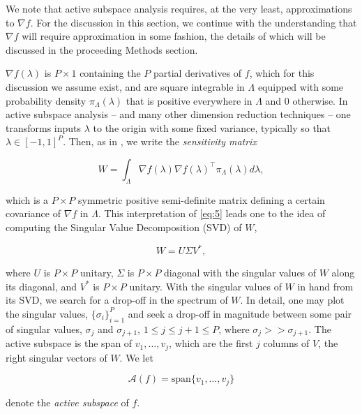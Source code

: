 \documentclass{amsart}
\newcommand{\A}{\mathcal{A}}
\begin{document}
We note that active subspace analysis requires, at the very least, approximations to $\nabla f$. For the discussion in this section, we continue with the understanding that $\nabla f$ will require approximation in some fashion, the details of which will be discussed in the proceeding Methods section. 

$\nabla f(\lambda)$ is $P\times 1$ containing the $P$ partial derivatives of $f$, which for this discussion we assume exist, and are square integrable in $\Lambda$ equipped with some probability density $\pi_\Lambda(\lambda)$ that is positive everywhere in $\Lambda$ and 0 otherwise. 
In active subspace analysis -- and many other dimension reduction techniques \cite{Russi} -- one transforms inputs $\lambda$ to the origin with some fixed variance, typically so that $\lambda\in [-1,1]^P$. Then, as in \cite{ConstantineMC}, we write the \textit{sensitivity matrix}

\begin{equation} \label{eq:3}
W=\int_\Lambda \nabla f(\lambda) \nabla f(\lambda)^\top  \pi_\Lambda(\lambda) d\lambda,
\end{equation} 

\noindent which is a $P\times P$ symmetric positive semi-definite matrix defining a certain covariance of $\nabla f$ in $\Lambda$. This interpretation of \eqref{eq:5} leads one to the idea of computing the Singular Value Decomposition (SVD) of $W$,

\begin{equation} \label{eq:4}
W=U\Sigma V^*,
\end{equation} 

\noindent where $U$ is $P \times P$ unitary, $\Sigma$ is $P \times P$ diagonal with the singular values of $W$ along its diagonal, and $V^*$ is $P \times P$ unitary. With the singular values of $W$ in hand from its SVD, we search for a drop-off in the spectrum of $W$. In detail, one may plot the singular values, $\{\sigma_i\}_{i=1}^P$ and seek a drop-off in magnitude between some pair of singular values, $\sigma_{j}$ and $\sigma_{j+1}$, $1\leq j \leq j+1 \leq P$, where $\sigma_{j}>>\sigma_{j+1}$. The active subspace is the span of $v_1,\ldots,v_{j}$, which are the first $j$ columns of $V$, the right singular vectors of $W$. We let

\begin{equation} \label{eq:5}
\A(f)=\text{span}\{v_1,\ldots,v_j\}
\end{equation}

\noindent denote the \textit{active subspace} of $f$.
\end{document}

